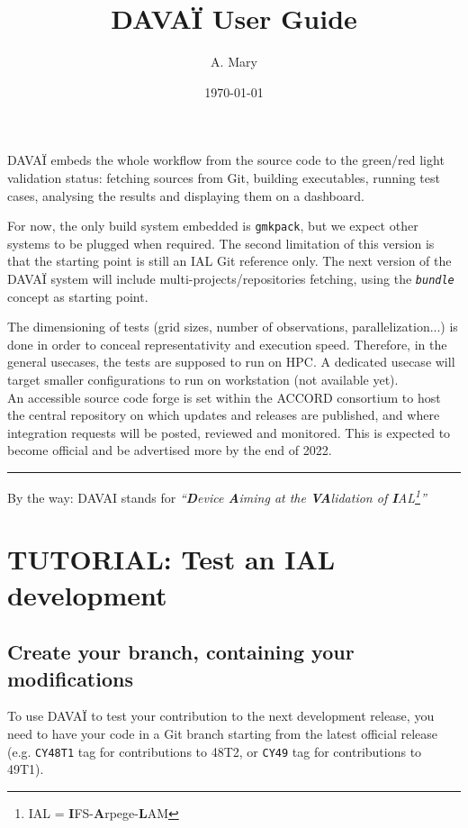\documentclass[a4paper,10pt,twoside]{article}
\title{DAVAÏ User Guide}
\author{A. Mary}
\date{\today}
\begin{document}
\maketitle

\tableofcontents
\vspace{1cm}
\newpage


DAVAÏ embeds the whole workflow from the source code to the green/red light validation status: fetching sources from Git, building executables, running test cases, analysing the results and displaying them on a dashboard.

For now, the only build system embedded is \texttt{gmkpack}, but we expect other systems to be plugged when required. The second limitation of this version is that the starting point is still an IAL Git reference only. The next version of the DAVAÏ system will include multi-projects/repositories fetching, using the \textit{\texttt{bundle}} concept as starting point.

The dimensioning of tests (grid sizes, number of observations, parallelization...) is done in order to conceal representativity and execution speed. Therefore, in the general usecases, the tests are supposed to run on HPC. A dedicated usecase will target smaller configurations to run on workstation (not available yet).\\

An accessible source code forge is set within the ACCORD consortium to host the central repository on which updates and releases are published, and where integration requests will be posted, reviewed and monitored. This is expected to become official and be advertised more by the end of 2022.
\begin{center}
 \rule{8cm}{1pt}
\end{center}

By the way: DAVAI stands for \textit{``\textbf{D}evice \textbf{A}iming at the \textbf{VA}lidation of \textbf{I}AL\footnote{IAL = \textbf{I}FS-\textbf{A}rpege-\textbf{L}AM}''}

\newpage
\section{TUTORIAL: Test an IAL development} 
\subsection{Create your branch, containing your modifications}
To use DAVAÏ to test your contribution to the next development release, you need to have your code in a Git branch starting from the latest official release (e.g. \texttt{CY48T1} tag for contributions to 48T2, or \texttt{CY49} tag for contributions to 49T1).
\end{document}
